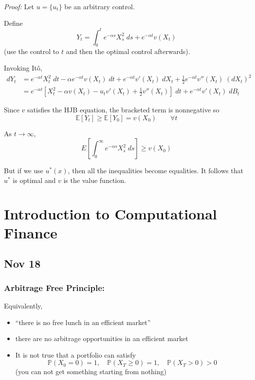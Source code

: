 \documentclass[12pt]{report}
\renewcommand{\P}{\mathbb{P}}
\newcommand{\E}{\mathbb{E}}
\newenvironment*{tbox}[2][gray]{
    \begin{tcolorbox}[
        parbox=false,
        colback=#1!5!white,
        colframe=#1!75!black,
        breakable,
        title={#2}
    ]}
    {\end{tcolorbox}}
\begin{document}
    \begin{tbox}{\textbf{Theorem:} The twice continuously differentiable solution $v$ we obtained above is indeed the value function of the control problem. Further,
        \[u^*(x) = \begin{cases}
            b & x > \theta\\
            a & x < \theta
        \end{cases}\] 
        defines a control strategy $u_t^* = u^*(X_t)$ which is optimal}
        \emph{Proof:} Let $u = \{u_t\}$ be an arbitrary control. 

        Define 
        \[Y_t = \int_0^t e^{-\alpha s} X_s^2 \; ds + e^{-\alpha t} v(X_t)\]
        (use the control to $t$ and then the optimal control afterwards). 

        Invoking Itô, 
        \begin{align*}
            dY_t &= e^{-\alpha t} X_t^2\; dt - \alpha e^{-\alpha t} v(X_t)\; dt + e^{-\alpha t} v'(X_t)\; dX_t + \frac{1}{2} e^{-\alpha t} v''(X_t) \; (dX_t)^2\\
            &= e^{-\alpha t} [X_t^2 - \alpha v(X_t) - u_t v'(X_t) + \frac{1}{2}v''(X_t)]\; dt + e^{-\alpha t} v'(X_t)\; dB_t
        \end{align*}

        Since $v$ satisfies the HJB equation, the bracketed term is nonnegative so 
        \[\E[Y_t] \geq \E[Y_0] = v(X_0) \qquad \forall t\]

        As $t \to \infty$,
        \[E\left[\int_0^{\infty} e^{-\alpha s} X_s^2\; ds\right] \geq v(X_0)\] 

        But if we use $u^*(x)$, then all the inequalities become equalities. It follows that $u^*$ is optimal and $v$ is the value function.
    \end{tbox}

\chapter{Introduction to Computational Finance}
\section{Nov 18}
\subsection*{Arbitrage Free Principle:} 
    Equivalently,
    \begin{itemize}
        \item ``there is no free lunch in an efficient market''
        \item there are no arbitrage opportunities in an efficient market
        \item It is not true that a portfolio can satisfy 
        \[\P(X_0 = 0) = 1, \quad \P(X_T \geq 0) = 1, \quad \P(X_T > 0) > 0\]
        (you can not get something starting from nothing)
    \end{itemize}
\end{document}
